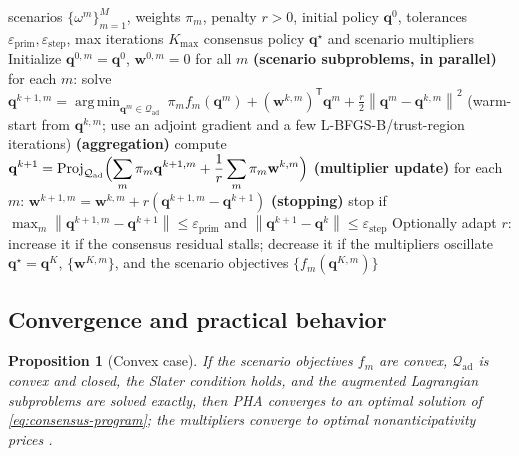 \documentclass[11pt]{article}
\numberwithin{equation}{section}
\newcommand{\norm}[1]{\left\lVert #1 \right\rVert}
\newcommand{\qq}{\mathbf{q}}
\newcommand{\ww}{\mathbf{w}}
\newcommand{\T}{\mathsf{T}}
\newcommand{\argmin}{\operatorname*{arg\,min}}
\newcommand{\Proj}{\operatorname{Proj}}
\theoremstyle{plain}
\newtheorem{proposition}{Proposition}
\begin{document}
\begin{algorithm}[htbp]
\caption{Rockafellar--Wets progressive hedging for the SAA problem}
\label{alg:pha}
\begin{algorithmic}[1]
\Require scenarios $\{\omega^m\}_{m=1}^{M}$, weights $\pi_m$, penalty $r>0$,
         initial policy $\qq^0$, tolerances $\varepsilon_{\mathrm{prim}},
         \varepsilon_{\mathrm{step}}$, max iterations $K_{\max}$
\Ensure consensus policy $\qq^\star$ and scenario multipliers
\State Initialize $\qq^{0,m}=\qq^0$, $\ww^{0,m}=0$ for all $m$
  \State \textbf{(scenario subproblems, in parallel)} for each $m$:
         \Statex \hspace{1.2em} solve
         $\displaystyle \qq^{k+1,m}=\argmin_{\qq^m\in\mathcal{Q}_{\mathrm{ad}}}
         \ \pi_m f_m(\qq^m)+(\ww^{k,m})^{\T}\qq^m
         +\frac{r}{2}\norm{\qq^m-\qq^{k,m}}^2$
         \Statex \hspace{1.2em} (warm-start from $\qq^{k,m}$; use an adjoint
         gradient and a few L-BFGS-B/trust-region iterations)
  \State \textbf{(aggregation)} compute
         $\displaystyle \qq^{k+1}
         =\Proj_{\mathcal{Q}_{\mathrm{ad}}}
         \Bigl(\sum_m\pi_m\qq^{k+1,m}
         +\frac{1}{r}\sum_m\pi_m\ww^{k,m}\Bigr)$
  \State \textbf{(multiplier update)} for each $m$:
         $\ww^{k+1,m}=\ww^{k,m}+r(\qq^{k+1,m}-\qq^{k+1})$
  \State \textbf{(stopping)} stop if
         $\max_m\norm{\qq^{k+1,m}-\qq^{k+1}}\le\varepsilon_{\mathrm{prim}}$
         and $\norm{\qq^{k+1}-\qq^{k}}\le\varepsilon_{\mathrm{step}}$
         \State Optionally adapt $r$: increase it if the consensus residual
         stalls; decrease it if the multipliers oscillate
\EndFor
\State \Return $\qq^\star=\qq^{K}$, $\{\ww^{K,m}\}$, and the scenario
       objectives $\{f_m(\qq^{K,m})\}$
\end{algorithmic}
\end{algorithm}

\subsection{Convergence and practical behavior}

\begin{proposition}[Convex case]
\label{prop:pha-convex}
If the scenario objectives $f_m$ are convex, $\mathcal{Q}_{\mathrm{ad}}$ is
convex and closed, the Slater condition holds, and the augmented Lagrangian
subproblems are solved exactly, then PHA converges to an optimal solution of
\eqref{eq:consensus-program}; the multipliers converge to optimal
nonanticipativity prices \citep{rockafellar1991}.
\end{proposition}
\end{document}
